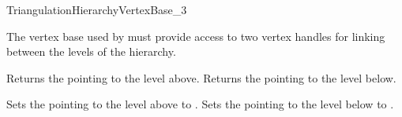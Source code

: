 
\begin{ccRefConcept}{TriangulationHierarchyVertexBase_3}

\ccDefinition

The vertex base used by  must provide
access to two vertex handles for linking between the levels of the hierarchy.



\ccAccessFunctions
{}
\ccTagFullDeclarations

{Returns the  pointing to the level above.}
\ccGlue
{}
{Returns the  pointing to the level below.}


{Sets the  pointing to the level above to .}
\ccGlue
{}
{Sets the  pointing to the level below to .}

\ccHasModels



\end{ccRefConcept}
